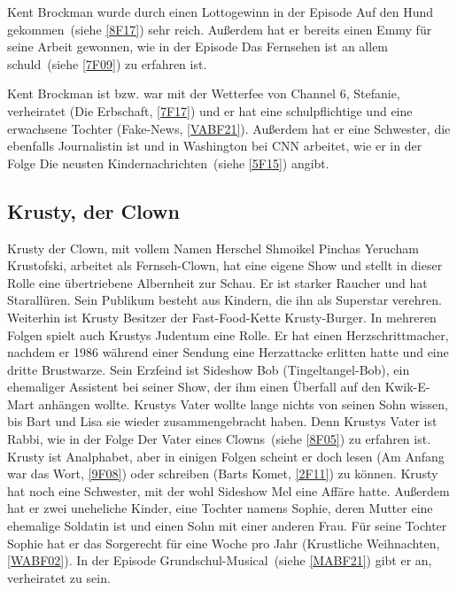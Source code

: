 Kent Brockman wurde durch einen Lottogewinn in der Episode \glqq Auf den Hund gekommen\grqq\ (siehe \ref{8F17}) sehr reich. Außerdem hat er bereits einen Emmy für seine Arbeit gewonnen, wie in der Episode \glqq Das Fernsehen ist an allem schuld\grqq\ (siehe \ref{7F09}) zu erfahren ist.

Kent Brockman ist bzw. war mit der Wetterfee von Channel 6, Stefanie, verheiratet (\glqq Die Erbschaft\grqq , \ref{7F17}) und er hat eine schulpflichtige und eine erwachsene Tochter (\glqq Fake-News\grqq, \ref{VABF21}). Außerdem hat er eine Schwester, die ebenfalls Journalistin ist und in Washington bei CNN arbeitet, wie er in der Folge \glqq Die neusten Kindernachrichten\grqq\ (siehe \ref{5F15}) angibt.


\subsection{Krusty, der Clown}\label{HerschelKrustofski}
Krusty der Clown, mit vollem Namen Herschel Shmoikel Pinchas Yerucham Krustofski, arbeitet als Fernseh-Clown, hat eine eigene Show und stellt in dieser Rolle eine übertriebene Albernheit zur Schau. Er ist starker Raucher und hat Starallüren. Sein Publikum besteht aus Kindern, die ihn als Superstar verehren. Weiterhin ist Krusty Besitzer der Fast-Food-Kette Krusty-Burger. In mehreren Folgen spielt auch Krustys Judentum eine Rolle. Er hat einen Herzschrittmacher, nachdem er 1986 während einer Sendung eine Herzattacke erlitten hatte und eine dritte Brustwarze. Sein Erzfeind ist Sideshow Bob (Tingeltangel-Bob), ein ehemaliger Assistent bei seiner Show, der ihm einen Überfall auf den Kwik-E-Mart anhängen wollte. Krustys Vater wollte lange nichts von seinen Sohn wissen, bis Bart und Lisa sie wieder zusammengebracht haben. Denn Krustys Vater ist Rabbi, wie in der Folge \glqq Der Vater eines Clowns\grqq\ (siehe \ref{8F05}) zu erfahren ist. Krusty ist Analphabet, aber in einigen Folgen scheint er doch lesen (\glqq Am Anfang war das Wort\grqq , \ref{9F08}) oder schreiben (\glqq Barts Komet\grqq , \ref{2F11}) zu können. Krusty hat noch eine Schwester, mit der wohl Sideshow Mel eine Affäre hatte. Außerdem hat er zwei uneheliche Kinder, eine Tochter namens Sophie, deren Mutter eine ehemalige Soldatin ist und einen Sohn mit einer anderen Frau. Für seine Tochter Sophie hat er das Sorgerecht für eine Woche pro Jahr (\glqq Krustliche Weihnachten\grqq, \ref{WABF02}). In der Episode \glqq Grundschul-Musical\grqq\ (siehe \ref{MABF21}) gibt er an, verheiratet zu sein.

